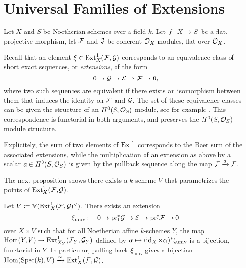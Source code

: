 \section{Universal Families of Extensions}

Let $X$ and $S$ be Noetherian schemes over a field $k$. Let $f \colon X \to S$ be a flat, projective morphism, let $\mathcal{F}$ and $\mathcal{G}$ be coherent $\mathcal{O}_X$-modules, flat over $\mathcal{O}_X$.

Recall that an element $\xi \in \operatorname{Ext}^1_{X}(\mathcal{F},\mathcal{G})$ corresponds to an equivalence class of short exact sequences, or \emph{extensions}, of the form
\[
	0 \to \mathcal{G} \to \mathcal{E} \to \mathcal{F} \to 0,
\]
where two such sequences are equivalent if there exists an isomorphism between them that induces the identity on $\mathcal{F}$ and $\mathcal{G}$. The set of these equivalence classes can be given the structure of an $H^0(S,\mathcal{O}_S)$-module, see for example \cite[{}3.4]{weibel-homological-algebra}. This correspondence is functorial in both arguments, and preserves the $H^0(S, \mathcal{O}_S)$-module structure.

Explicitely, the sum of two elements of $\operatorname{Ext}^1$ corresponds to the Baer sum of the associated extensions, while the multiplication of an extension
as above by a scalar $a\in H^0(S,\mathcal{O}_S)$ is given by the pullback sequence along the map $\mathcal{F}\xrightarrow{a}\mathcal{F}$.

The next proposition shows there exists a $k$-scheme $V$ that parametrizes the points of $\operatorname{Ext}^{1}_X(\mathcal{F},\mathcal{G})$.

\begin{proposition} \label{cor:universal-extension}
Let $V \coloneqq \mathbb{V}(\operatorname{Ext}^1_X(\mathcal{F},\mathcal{G})^\vee)$. There exists an extension
	\[
		\xi_{\mathrm{univ}} \colon \quad 0 \to \mathrm{pr}_1^{*}\mathcal{G} \to \mathcal{E} \to \mathrm{pr}_1^{*}\mathcal{F} \to 0
	\]
over $X\times V$
such that for all Noetherian affine $k$-schemes $Y$, the map
$\operatorname{Hom}(Y,V)\to\operatorname{Ext}^1_{X_Y}(\mathcal{F}_Y,\mathcal{G}_Y)$ defined by
$\alpha \mapsto (\operatorname{id}_X\times \alpha)^{*} \xi_{\mathrm{univ}}$
is a bijection, functorial in $Y$.
In particular, pulling back $\xi_{\text{univ}}$ gives a bijection $\operatorname{Hom}(\operatorname{Spec}(k),V)\xrightarrow{\sim} \operatorname{Ext}^1_{X}(\mathcal{F},\mathcal{G})$.
\end{proposition}

